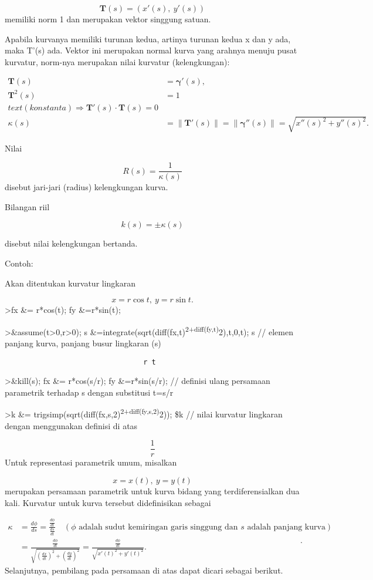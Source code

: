 \documentclass[
]{book}
\begin{document}
\[\mathbf{T}(s)=(x'(s),\ y'(s))\]memiliki norm 1 dan merupakan vektor singgung satuan.

Apabila kurvanya memiliki turunan kedua, artinya turunan kedua x dan y ada, maka T'(s) ada. Vektor ini merupakan normal kurva yang arahnya menuju pusat kurvatur, norm-nya merupakan nilai kurvatur (kelengkungan):

\[\begin{aligned}\mathbf{T}(s) &= \mathbf{\gamma}'(s),\\ \mathbf{T}^{2}(s) &=1\\text{(konstanta)}\Rightarrow \mathbf{T}'(s)\cdot \mathbf{T}(s)=0\\ \kappa(s)&=\|\mathbf{T}'(s)\|=\|\mathbf{\gamma}''(s)\|=\sqrt{x''(s)^{2}+y''(s)^{2}}.\end{aligned}\]

Nilai

\[R(s)=\frac{1}{\kappa(s)}\]disebut jari-jari (radius) kelengkungan kurva.

Bilangan riil

\[k(s) = \pm\kappa(s)\]

disebut nilai kelengkungan bertanda.

Contoh:

Akan ditentukan kurvatur lingkaran

\[x=r\cos t,\ y= r\sin t.\]\textgreater fx \&= r*cos(t); fy \&=r*sin(t);

\textgreater\&assume(t\textgreater0,r\textgreater0); s \&=integrate(sqrt(diff(fx,t)\textsuperscript{2+diff(fy,t)}2),t,0,t); s // elemen panjang kurva, panjang busur lingkaran (s)

\begin{verbatim}
                                 r t
\end{verbatim}

\textgreater\&kill(s); fx \&= r*cos(s/r); fy \&=r*sin(s/r); // definisi ulang persamaan parametrik terhadap s dengan substitusi t=s/r

\textgreater k \&= trigsimp(sqrt(diff(fx,s,2)\textsuperscript{2+diff(fy,s,2)}2)); \$k // nilai kurvatur lingkaran dengan menggunakan definisi di atas

\[\frac{1}{r}\]Untuk representasi parametrik umum, misalkan

\[x = x(t),\ y= y(t)\]merupakan persamaan parametrik untuk kurva bidang yang terdiferensialkan dua kali. Kurvatur untuk kurva tersebut didefinisikan sebagai

\[\begin{aligned}\kappa &= \frac{d\phi}{ds}=\frac{\frac{d\phi}{dt}}{\frac{ds}{dt}}\quad (\phi \text{ adalah sudut kemiringan garis singgung dan }s \text{ adalah panjang kurva})\\ &=\frac{\frac{d\phi}{dt}}{\sqrt{(\frac{dx}{dt})^2+(\frac{dy}{dt})^2}}= \frac{\frac{d\phi}{dt}}{\sqrt{x'(t)^2+y'(t)^2}}.\end{aligned}.\]Selanjutnya, pembilang pada persamaan di atas dapat dicari sebagai berikut.
\end{document}
